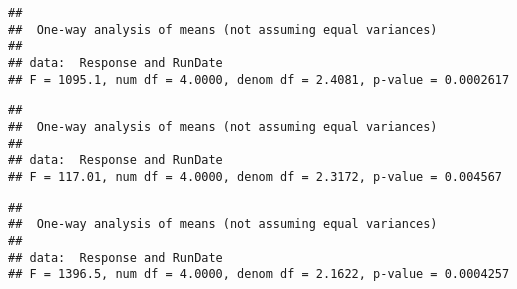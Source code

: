 \documentclass[
]{article}
\newenvironment{Shaded}{\begin{snugshade}}{\end{snugshade}}
\newcommand{\DataTypeTok}[1]{\textcolor[rgb]{0.13,0.29,0.53}{#1}}
\newcommand{\DecValTok}[1]{\textcolor[rgb]{0.00,0.00,0.81}{#1}}
\newcommand{\KeywordTok}[1]{\textcolor[rgb]{0.13,0.29,0.53}{\textbf{#1}}}
\newcommand{\NormalTok}[1]{#1}
\newcommand{\OperatorTok}[1]{\textcolor[rgb]{0.81,0.36,0.00}{\textbf{#1}}}
\newcommand{\OtherTok}[1]{\textcolor[rgb]{0.56,0.35,0.01}{#1}}
\newcommand{\StringTok}[1]{\textcolor[rgb]{0.31,0.60,0.02}{#1}}
\begin{document}
\begin{verbatim}
## 
##  One-way analysis of means (not assuming equal variances)
## 
## data:  Response and RunDate
## F = 1095.1, num df = 4.0000, denom df = 2.4081, p-value = 0.0002617
\end{verbatim}

\begin{Shaded}
\end{Shaded}

\begin{verbatim}
## 
##  One-way analysis of means (not assuming equal variances)
## 
## data:  Response and RunDate
## F = 117.01, num df = 4.0000, denom df = 2.3172, p-value = 0.004567
\end{verbatim}

\begin{Shaded}
\end{Shaded}

\begin{verbatim}
## 
##  One-way analysis of means (not assuming equal variances)
## 
## data:  Response and RunDate
## F = 1396.5, num df = 4.0000, denom df = 2.1622, p-value = 0.0004257
\end{verbatim}

\begin{Shaded}
\end{Shaded}
\end{document}
